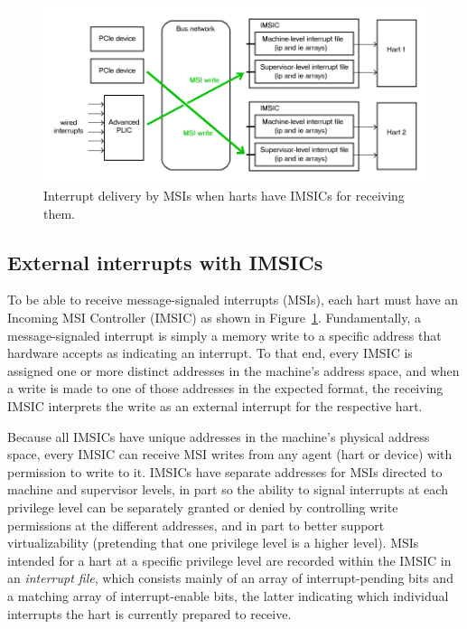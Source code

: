 \begin{figure}[th]
\centerline{\includegraphics[scale=0.55]{intrsWithIMSICs.png}}
\caption{%
Interrupt delivery by MSIs when harts have IMSICs for receiving them.%
}
\label{fig:intrsWithIMSICs}
\end{figure}

\FloatBarrier

\subsection{External interrupts with IMSICs}

To be able to receive message-signaled interrupts (MSIs), each
{\RISCV} hart must have an Incoming MSI Controller (IMSIC) as shown in
Figure~\ref{fig:intrsWithIMSICs}.
Fundamentally, a message-signaled interrupt is simply a memory write to
a specific address that hardware accepts as indicating an interrupt.
To that end, every IMSIC is assigned one or more distinct addresses in
the machine's address space, and when a write is made to one of those
addresses in the expected format, the receiving IMSIC interprets the
write as an external interrupt for the respective hart.

Because all IMSICs have unique addresses in the machine's physical
address space, every IMSIC can receive MSI writes from any agent (hart
or device) with permission to write to it.
IMSICs have separate addresses for MSIs directed to machine and
supervisor levels, in part so the ability to signal interrupts at each
privilege level can be separately granted or denied by controlling
write permissions at the different addresses, and in part to better
support virtualizability (pretending that one privilege level is a
higher level).
MSIs intended for a hart at a specific privilege level are recorded
within the IMSIC in an \emph{interrupt file}, which consists mainly
of an array of interrupt-pending bits and a matching array of
interrupt-enable bits, the latter indicating which individual
interrupts the hart is currently prepared to receive.

